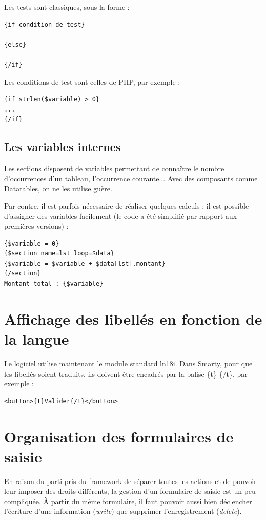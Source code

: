 Les tests sont classiques, sous la forme : 
\begin{lstlisting}
{if condition_de_test}

{else}

{/if}
\end{lstlisting}

Les conditions de test sont celles de PHP, par exemple :
\begin{lstlisting}
{if strlen($variable) > 0}
...
{/if}
\end{lstlisting}

\subsection{Les variables internes}
Les sections disposent de variables permettant de connaître le nombre d'occurrences d'un tableau, l'occurrence courante... Avec des composants comme Datatables, on ne les utilise guère.

Par contre, il est parfois nécessaire de réaliser quelques calculs : il est possible d'assigner des variables facilement (le code a été simplifié par rapport aux premières versions) :

\begin{lstlisting}
{$variable = 0}
{$section name=lst loop=$data}
{$variable = $variable + $data[lst].montant}
{/section}
Montant total : {$variable}
\end{lstlisting}

\section{Affichage des libellés en fonction de la langue}

Le logiciel utilise maintenant le module standard ln18i. Dans Smarty, pour que les libellés soient traduits, ils doivent être encadrés par la balise \{t\} \{/t\}, par exemple :
\begin{lstlisting}
<button>{t}Valider{/t}</button>
\end{lstlisting}


\section{Organisation des formulaires de saisie}

En raison du parti-pris du framework de séparer toutes les actions et de pouvoir leur imposer des droits différents, la gestion d'un formulaire de saisie est un peu compliquée. À partir du même formulaire, il faut pouvoir aussi bien déclencher l'écriture d'une information (\textit{write}) que supprimer l'enregistrement (\textit{delete}). 

